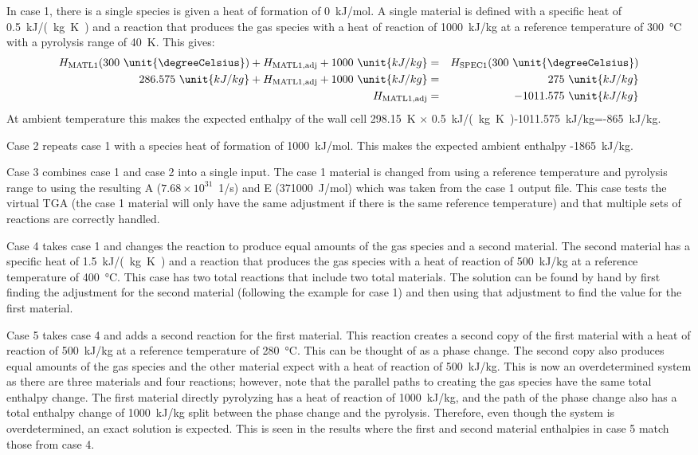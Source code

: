 \documentclass[11pt]{book}
\begin{document}
In case 1, there is a single species is given a heat of formation of 0~\unit{kJ/mol}. A single material is defined with a specific heat of 0.5~\unit{kJ/(kg.K)} and a reaction that produces the gas species with a heat of reaction of 1000~\unit{kJ/kg} at a reference temperature of 300~\unit{\degreeCelsius} with a pyrolysis range of 40~K.  This gives:
\begin{eqnarray}
   H_{\rm MATL1}(300~\unit{\degreeCelsius}) + H_{\rm MATL1,adj} + 1000~\unit{kJ/kg} &=& H_{\rm SPEC1}(300~\unit{\degreeCelsius}) \\
   286.575~\unit{kJ/kg} + H_{\rm MATL1,adj}+ 1000~\unit{kJ/kg} &=& 275~\unit{kJ/kg} \\
   H_{\rm MATL1,adj} &=&-1011.575~\unit{kJ/kg}
\end{eqnarray}
At ambient temperature this makes the expected enthalpy of the wall cell 298.15~K $\times$ 0.5~\unit{kJ/(kg.K)}-1011.575~\unit{kJ/kg}=-865~\unit{kJ/kg}.

Case 2 repeats case 1 with a species heat of formation of 1000~\unit{kJ/mol}. This makes the expected ambient enthalpy -1865~\unit{kJ/kg}.

Case 3 combines case 1 and case 2 into a single input. The case 1 material is changed from using a reference temperature and pyrolysis range to using the resulting A ($7.68\times10^{31}$~1/s) and E (371000~\unit{J/mol}) which was taken from the case 1 output file. This case tests the virtual TGA (the case 1 material will only have the same adjustment if there is the same reference temperature) and that multiple sets of reactions are correctly handled.

Case 4 takes case 1 and changes the reaction to produce equal amounts of the gas species and a second material. The second material has a specific heat of 1.5~\unit{kJ/(kg.K)} and a reaction that produces the gas species with a heat of reaction of 500~\unit{kJ/kg} at a reference temperature of 400~\unit{\degreeCelsius}. This case has two total reactions that include two total materials. The solution can be found by hand by first finding the adjustment for the second material (following the example for case 1) and then using that adjustment to find the value for the first material.

Case 5 takes case 4 and adds a second reaction for the first material. This reaction creates a second copy of the first material with a heat of reaction of 500~\unit{kJ/kg} at a reference temperature of 280~\unit{\degreeCelsius}. This can be thought of as a phase change. The second copy also produces equal amounts of the gas species and the other material expect with a heat of reaction of 500~\unit{kJ/kg}. This is now an overdetermined system as there are three materials and four reactions; however, note that the parallel paths to creating the gas species have the same total enthalpy change. The first material directly pyrolyzing has a heat of reaction of 1000~\unit{kJ/kg}, and the path of the phase change also has a total enthalpy change of 1000~\unit{kJ/kg} split between the phase change and the pyrolysis. Therefore, even though the system is overdetermined, an exact solution is expected. This is seen in the results where the first and second material enthalpies in case 5 match those from case 4.
\end{document}
